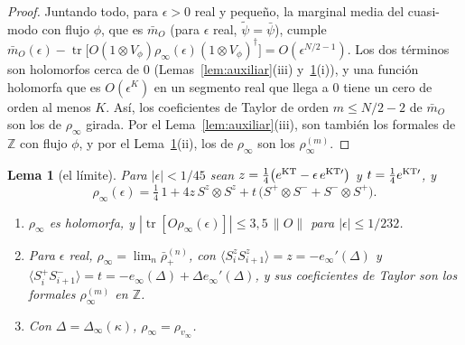 \documentclass[11pt,a4paper]{article}
\newtheorem{lema}[teorema]{Lema}
\theoremstyle{remark}
\newcommand{\tr}{\operatorname{tr}}
\newcommand{\ev}[1]{\langle #1\rangle}
\begin{document}
\begin{proof}
Juntando todo, para $\epsilon>0$ real y pequeño, la marginal media del cuasi-modo con flujo $\phi$, que es
$\bar m_O$ (para $\epsilon$ real, $\tilde\psi=\bar\psi$), cumple
$\bar m_O(\epsilon)-\tr\big[O(1\otimes V_\phi)\rho_\infty(\epsilon)(1\otimes V_\phi)^\dagger\big]=O(\epsilon^{N/2-1})$.
Los dos términos son holomorfos cerca de $0$ (Lemas~\ref{lem:auxiliar}(iii) y~\ref{lem:rhoinf}(i)), y una
función holomorfa que es $O(\epsilon^K)$ en un segmento real que llega a $0$ tiene un cero de orden al
menos $K$. Así, los coeficientes de Taylor de orden $m\le N/2-2$ de $\bar m_O$ son los de $\rho_\infty$
girada. Por el Lema~\ref{lem:auxiliar}(iii), son también los formales de $\mathbb Z$ con flujo $\phi$, y por
el Lema~\ref{lem:rhoinf}(ii), los de $\rho_\infty$ son los $\rho_\infty^{(m)}$.
\end{proof}

\begin{lema}[el límite]\label{lem:rhoinf}
Para $|\epsilon|<1/45$ sean $z=\tfrac14\big(e^{\rm KT}-\epsilon\,e^{{\rm KT}\prime}\big)$ y
$t=\tfrac14e^{{\rm KT}\prime}$, y
\[
  \rho_\infty(\epsilon)=\tfrac14\,1+4z\,S^z\otimes S^z+t\,\big(S^+\otimes S^-+S^-\otimes S^+\big).
\]
\begin{enumerate}
\item[(i)] $\rho_\infty$ es holomorfa, y $|\tr[O\rho_\infty(\epsilon)]|\le3{,}5\,\|O\|$ para $|\epsilon|\le1/232$.
\item[(ii)] Para $\epsilon$ real, $\rho_\infty=\lim_n\bar\rho_+^{(n)}$, con $\ev{S^z_iS^z_{i+1}}=z=-e_\infty'(\Delta)$ y
  $\ev{S^+_iS^-_{i+1}}=t=-e_\infty(\Delta)+\Delta e_\infty'(\Delta)$, y sus coeficientes de Taylor son los
  formales $\rho^{(m)}_\infty$ en $\mathbb Z$.
\item[(iii)] Con $\Delta=\Delta_\infty(\kappa)$, $\rho_\infty=\rho_{v_\infty}$.
\end{enumerate}
\end{lema}
\end{document}
